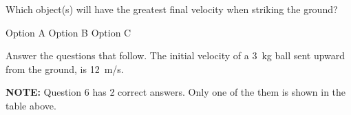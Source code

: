 \documentclass[answers,dvipsnames]{exam}
\begin{document}
\begin{questions}
\question
Which object(s) will have the greatest final velocity when striking the ground?

\begin{randomizechoices}[norandomize]
    \choice Option A
    \correctchoice Option B
    \choice Option C
\end{randomizechoices}

\question
Answer the questions that follow. The initial velocity of a \SI{3}{kg} ball sent upward from the ground, is \SI{12}{m/s}. 


\clearpage
\printkeytable
\bigskip

\textbf{NOTE:} Question 6 has 2 correct answers. Only one of the them is shown in the table above.



\end{questions}
\end{document}
